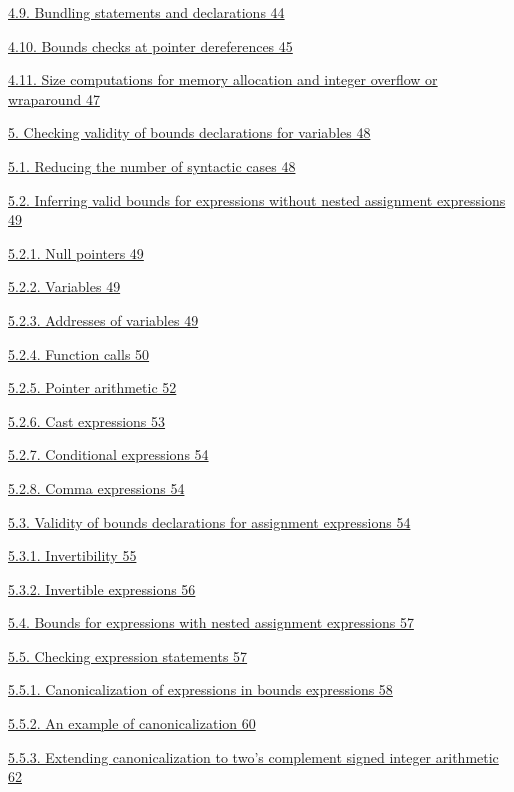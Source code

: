 \documentclass[]{article}
\begin{document}
\protect\hyperlink{ux5fToc440551880}{4.9. Bundling statements and
declarations 44}

\protect\hyperlink{ux5fToc440551881}{4.10. Bounds checks at pointer
dereferences 45}

\protect\hyperlink{ux5fToc440551882}{4.11. Size computations for memory
allocation and integer overflow or wraparound 47}

\protect\hyperlink{ux5fToc440551883}{5. Checking validity of bounds
declarations for variables 48}

\protect\hyperlink{ux5fToc440551884}{5.1. Reducing the number of
syntactic cases 48}

\protect\hyperlink{ux5fToc440551885}{5.2. Inferring valid bounds for
expressions without nested assignment expressions 49}

\protect\hyperlink{ux5fToc440551886}{5.2.1. Null pointers 49}

\protect\hyperlink{ux5fToc440551887}{5.2.2. Variables 49}

\protect\hyperlink{ux5fToc440551888}{5.2.3. Addresses of variables 49}

\protect\hyperlink{ux5fToc440551889}{5.2.4. Function calls 50}

\protect\hyperlink{ux5fToc440551890}{5.2.5. Pointer arithmetic 52}

\protect\hyperlink{ux5fToc440551891}{5.2.6. Cast expressions 53}

\protect\hyperlink{ux5fToc440551892}{5.2.7. Conditional expressions 54}

\protect\hyperlink{ux5fToc440551893}{5.2.8. Comma expressions 54}

\protect\hyperlink{ux5fToc440551894}{5.3. Validity of bounds
declarations for assignment expressions 54}

\protect\hyperlink{ux5fToc440551895}{5.3.1. Invertibility 55}

\protect\hyperlink{ux5fToc440551896}{5.3.2. Invertible expressions 56}

\protect\hyperlink{ux5fToc440551897}{5.4. Bounds for expressions with
nested assignment expressions 57}

\protect\hyperlink{ux5fToc440551898}{5.5. Checking expression statements
57}

\protect\hyperlink{ux5fToc440551899}{5.5.1. Canonicalization of
expressions in bounds expressions 58}

\protect\hyperlink{ux5fToc440551900}{5.5.2. An example of
canonicalization 60}

\protect\hyperlink{ux5fToc440551901}{5.5.3. Extending canonicalization
to two's complement signed integer arithmetic 62}
\end{document}
